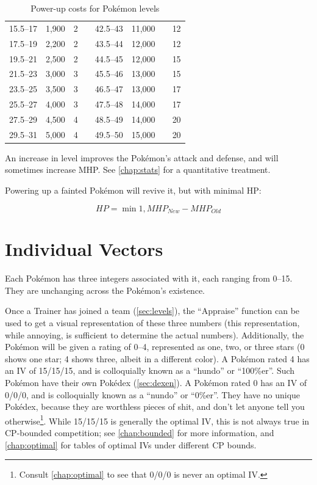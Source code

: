 \begin{table}
\begin{center}
\begin{tabular}[ht]{rrrr|rrrr}
    15.5--17 & 1,900 & 2 & & 42.5--43 & 11,000 &    & 12 \\
    17.5--19 & 2,200 & 2 & & 43.5--44 & 12,000 &    & 12 \\
    19.5--21 & 2,500 & 2 & & 44.5--45 & 12,000 &    & 15 \\
    21.5--23 & 3,000 & 3 & & 45.5--46 & 13,000 &    & 15 \\
    23.5--25 & 3,500 & 3 & & 46.5--47 & 13,000 &    & 17 \\
    25.5--27 & 4,000 & 3 & & 47.5--48 & 14,000 &    & 17 \\ 
    27.5--29 & 4,500 & 4 & & 48.5--49 & 14,000 &    & 20 \\
    29.5--31 & 5,000 & 4 & & 49.5--50 & 15,000 &    & 20 \\
    \end{tabular}
  \end{center}
  \caption{Power-up costs for Pokémon levels}
  \label{table:powerups}
\end{table}
An increase in level improves the Pokémon's attack and defense, and
  will sometimes increase MHP\@.
See \autoref{chap:stats} for a quantitative treatment.

Powering up a fainted Pokémon will revive it, but with minimal HP\@:

\[ HP = \min{1, MHP_{New} - MHP_{Old} } \]

\section{Individual Vectors}
\label{sec:ivs}
Each Pokémon has three integers associated with it, each ranging from 0--15.
They are unchanging across the Pokémon's existence.

Once a Trainer has joined a team (\autoref{sec:levels}), the ``Appraise'' function can be used to
  get a visual representation of these three numbers (this representation,
  while annoying, is sufficient to determine the actual numbers).
Additionally, the Pokémon will be given a rating of 0--4, represented as
  one, two, or three stars (0 shows one star; 4 shows three, albeit in a different color).
A Pokémon rated 4 has an IV of 15/15/15, and is colloquially known as a ``hundo'' or ``100\%er''.
Such Pokémon have their own Pokédex (\autoref{sec:dexen}).
A Pokémon rated 0 has an IV of 0/0/0, and is colloquially known as a ``nundo'' or ``0\%er''.
They have no unique Pokédex, because they are worthless pieces of shit,
  and don't let anyone tell you otherwise\footnote{Consult \autoref{chap:optimal}
  to see that 0/0/0 is never an optimal IV.}.
While 15/15/15 is generally the optimal IV, this is not always true in CP-bounded
  competition; see \autoref{chap:bounded} for more information,
  and \autoref{chap:optimal} for tables of optimal IVs under different CP bounds.


